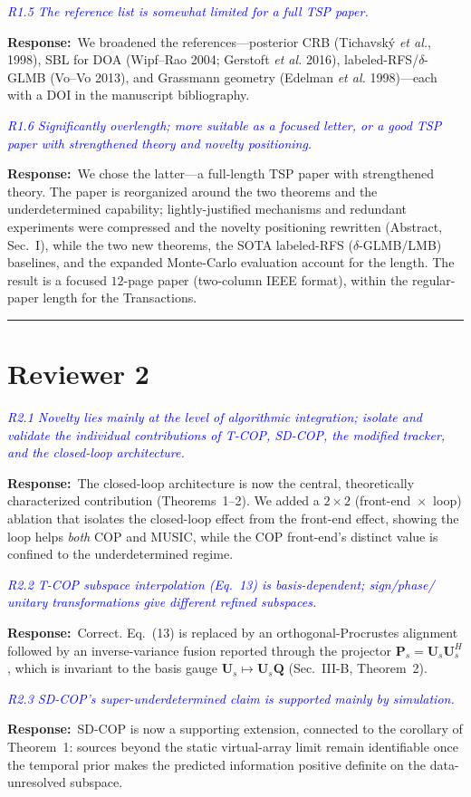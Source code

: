 \documentclass[11pt]{article}
\newcommand{\rc}[1]{\textit{\textcolor{blue}{#1}}}      %
\newcommand{\reply}{\par\noindent\textbf{Response:}\ }
\begin{document}
\rc{R1.5 The reference list is somewhat limited for a full TSP paper.}
\reply We broadened the references---posterior CRB (Tichavsk\'y \emph{et al.},
1998), SBL for DOA (Wipf--Rao 2004; Gerstoft \emph{et al.} 2016),
labeled-RFS/$\delta$-GLMB (Vo--Vo 2013), and Grassmann geometry
(Edelman \emph{et al.} 1998)---each with a DOI in the manuscript bibliography.

\rc{R1.6 Significantly overlength; more suitable as a focused letter, or a good
TSP paper with strengthened theory and novelty positioning.}
\reply We chose the latter---a full-length TSP paper with strengthened theory. The paper
is reorganized around the two theorems and the underdetermined capability;
lightly-justified mechanisms and redundant experiments were compressed and the
novelty positioning rewritten (Abstract, Sec.~I), while the two new theorems, the
SOTA labeled-RFS ($\delta$-GLMB/LMB) baselines, and the expanded Monte-Carlo
evaluation account for the length. The result is a focused $12$-page paper
(two-column IEEE format), within the regular-paper length for the Transactions.

\hrule
\section*{Reviewer 2}

\rc{R2.1 Novelty lies mainly at the level of algorithmic integration; isolate and
validate the individual contributions of T-COP, SD-COP, the modified tracker, and
the closed-loop architecture.}
\reply The closed-loop architecture is now the central, theoretically
characterized contribution (Theorems~1--2). We added a $2\times2$
(front-end~$\times$~loop) ablation that isolates the closed-loop effect from the
front-end effect, showing the loop helps \emph{both} COP and MUSIC, while the
COP front-end's distinct value is confined to the underdetermined regime.

\rc{R2.2 T-COP subspace interpolation (Eq.~13) is basis-dependent; sign/phase/
unitary transformations give different refined subspaces.}
\reply Correct. Eq.~(13) is replaced by an orthogonal-Procrustes alignment
followed by an inverse-variance fusion reported through the projector
$\mathbf P_s=\mathbf U_s\mathbf U_s^H$, which is invariant to the basis gauge
$\mathbf U_s\mapsto\mathbf U_s\mathbf Q$ (Sec.~III-B, Theorem~2).

\rc{R2.3 SD-COP's super-underdetermined claim is supported mainly by simulation.}
\reply SD-COP is now a supporting extension, connected to the corollary of
Theorem~1: sources beyond the static virtual-array limit remain identifiable once
the temporal prior makes the predicted information positive definite on the
data-unresolved subspace.
\end{document}
